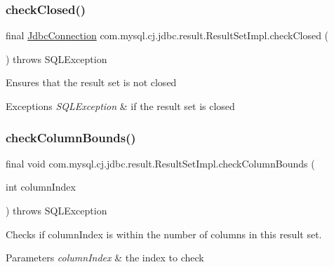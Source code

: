 \subsubsection{\texorpdfstring{check\+Closed()}{checkClosed()}}
{\footnotesize\ttfamily final \mbox{\hyperlink{interfacecom_1_1mysql_1_1cj_1_1jdbc_1_1_jdbc_connection}{Jdbc\+Connection}} com.\+mysql.\+cj.\+jdbc.\+result.\+Result\+Set\+Impl.\+check\+Closed (\begin{DoxyParamCaption}{ }\end{DoxyParamCaption}) throws S\+Q\+L\+Exception\hspace{0.3cm}{\ttfamily [protected]}}

Ensures that the result set is not closed


\begin{DoxyExceptions}{Exceptions}
{\em S\+Q\+L\+Exception} & if the result set is closed \\
\hline
\end{DoxyExceptions}
\mbox{\label{classcom_1_1mysql_1_1cj_1_1jdbc_1_1result_1_1_result_set_impl_aeca9bb7a778cc8e2c991cae4b2698f67}} 
\subsubsection{\texorpdfstring{check\+Column\+Bounds()}{checkColumnBounds()}}
{\footnotesize\ttfamily final void com.\+mysql.\+cj.\+jdbc.\+result.\+Result\+Set\+Impl.\+check\+Column\+Bounds (\begin{DoxyParamCaption}\item[{int}]{column\+Index }\end{DoxyParamCaption}) throws S\+Q\+L\+Exception\hspace{0.3cm}{\ttfamily [protected]}}

Checks if column\+Index is within the number of columns in this result set.


\begin{DoxyParams}{Parameters}
{\em column\+Index} & the index to check\\
\hline
\end{DoxyParams}

